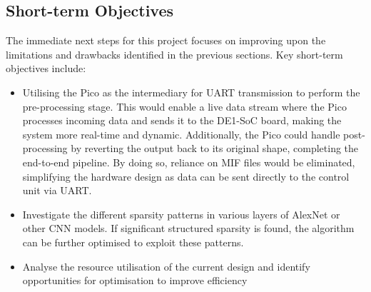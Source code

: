 \documentclass[12pt, a4paper, ukenglish]{article}
\begin{document}
    \subsection{Short-term Objectives} \label{sec: short-term}
    The immediate next steps for this project focuses on improving upon the limitations and drawbacks identified in the previous sections. Key short-term objectives include:
    \begin{itemize}
        \item Utilising the Pico as the intermediary for UART transmission to perform the pre-processing stage. This would enable a live data stream where the Pico processes incoming data and sends it to the DE1-SoC board, making the system more real-time and dynamic. Additionally, the Pico could handle post-processing by reverting the output back to its original shape, completing the end-to-end pipeline. By doing so, reliance on MIF files would be eliminated, simplifying the hardware design as data can be sent directly to the control unit via UART. 
        \item Investigate the different sparsity patterns in various layers of AlexNet or other CNN models. If significant structured sparsity is found, the algorithm can be further optimised to exploit these patterns.
        \item Analyse the resource utilisation of the current design and identify opportunities for optimisation to improve efficiency
    \end{itemize}
    
\end{document}
